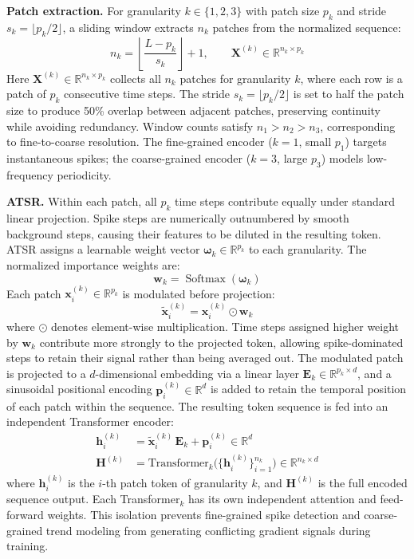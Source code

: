 \documentclass[journal]{IEEEtran}
\begin{document}
\textbf{Patch extraction.}
For granularity $k \in \{1,2,3\}$ with patch size $p_k$ and stride
$s_k = \lfloor p_k/2 \rfloor$, a sliding window extracts $n_k$ patches from
the normalized sequence:
\begin{equation}
n_k = \left\lfloor \frac{L - p_k}{s_k} \right\rfloor + 1,
\qquad
\mathbf{X}^{(k)} \in \mathbb{R}^{n_k \times p_k}
\label{eq:patches}
\end{equation}
Here $\mathbf{X}^{(k)} \in \mathbb{R}^{n_k \times p_k}$ collects all
$n_k$ patches for granularity $k$, where each row is a patch of $p_k$
consecutive time steps.
The stride $s_k = \lfloor p_k/2 \rfloor$ is set to half the patch size to
produce 50\% overlap between adjacent patches, preserving continuity while
avoiding redundancy.
Window counts satisfy $n_1 > n_2 > n_3$, corresponding to fine-to-coarse
resolution.
The fine-grained encoder ($k=1$, small $p_1$) targets instantaneous spikes;
the coarse-grained encoder ($k=3$, large $p_3$) models low-frequency
periodicity.

\textbf{ATSR.}
Within each patch, all $p_k$ time steps contribute equally under standard
linear projection.
Spike steps are numerically outnumbered by smooth background steps, causing
their features to be diluted in the resulting token.
ATSR assigns a learnable weight vector $\boldsymbol{\omega}_k \in \mathbb{R}^{p_k}$
to each granularity.
The normalized importance weights are:
\begin{equation}
\boldsymbol{w}_k = \operatorname{Softmax}(\boldsymbol{\omega}_k)
\label{eq:atsr}
\end{equation}
Each patch $\mathbf{x}^{(k)}_i \in \mathbb{R}^{p_k}$ is modulated before
projection:
\begin{equation}
\tilde{\mathbf{x}}^{(k)}_i = \mathbf{x}^{(k)}_i \odot \boldsymbol{w}_k
\label{eq:modulate}
\end{equation}
where $\odot$ denotes element-wise multiplication.
Time steps assigned higher weight by $\boldsymbol{w}_k$ contribute more
strongly to the projected token, allowing spike-dominated steps to retain
their signal rather than being averaged out.
The modulated patch is projected to a $d$-dimensional embedding via a
linear layer $\mathbf{E}_k \in \mathbb{R}^{p_k \times d}$, and a sinusoidal
positional encoding $\mathbf{p}^{(k)}_i \in \mathbb{R}^d$ is added to
retain the temporal position of each patch within the sequence.
The resulting token sequence is fed into an independent Transformer encoder:
\begin{align}
\mathbf{h}^{(k)}_i &= \tilde{\mathbf{x}}^{(k)}_i\,\mathbf{E}_k
                    + \mathbf{p}^{(k)}_i \in \mathbb{R}^d \label{eq:token} \\
\mathbf{H}^{(k)} &= \text{Transformer}_k\bigl(
  \{\mathbf{h}^{(k)}_i\}_{i=1}^{n_k}\bigr) \in \mathbb{R}^{n_k \times d}
\label{eq:encoder}
\end{align}
where $\mathbf{h}^{(k)}_i$ is the $i$-th patch token of granularity $k$,
and $\mathbf{H}^{(k)}$ is the full encoded sequence output.
Each Transformer$_k$ has its own independent attention and feed-forward
weights.
This isolation prevents fine-grained spike detection and coarse-grained
trend modeling from generating conflicting gradient signals during training.
\end{document}
